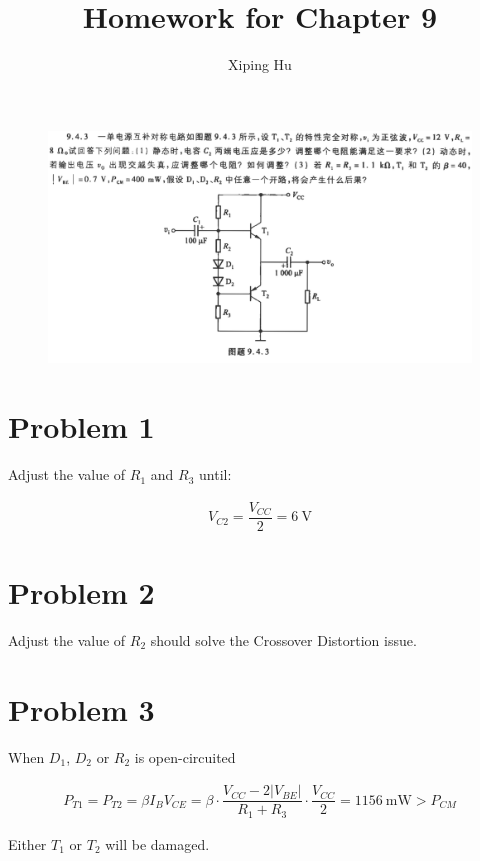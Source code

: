 \documentclass{article}
\author{Xiping Hu}
\affil{https://hxp.plus/}
\title{Homework for Chapter 9}
\newcommand{\si}[1]{\  \mathrm{#1}}
\begin{document}
\maketitle

\begin{figure}[H]
  \centering
  \includegraphics[width=\linewidth]{figures/Problem943}
\end{figure}

\section{Problem 1}

Adjust the value of $R_1$ and $R_3$ until: 

\begin{equation*}
  \begin{aligned}
    V_{C2} = \dfrac{V_{CC}}{2} = 6 \si{V} 
  \end{aligned}
\end{equation*}

\section{Problem 2}

Adjust the value of $R_2$ should solve the Crossover Distortion issue.

\section{Problem 3}

When $D_1$, $D_2$ or $R_2$ is open-circuited

\begin{equation*}
  \begin{aligned}
    P_{T1} = P_{T2} = \beta I_B V_{CE} = \beta \cdot \dfrac{V_{CC} - 2 |V_{BE}|}{R_1 + R_3} \cdot \dfrac{V_{CC}}{2} = 1156 \si{mW} > P_{CM}  
  \end{aligned}
\end{equation*}

Either $T_1$ or $T_2$ will be damaged.
\end{document}

